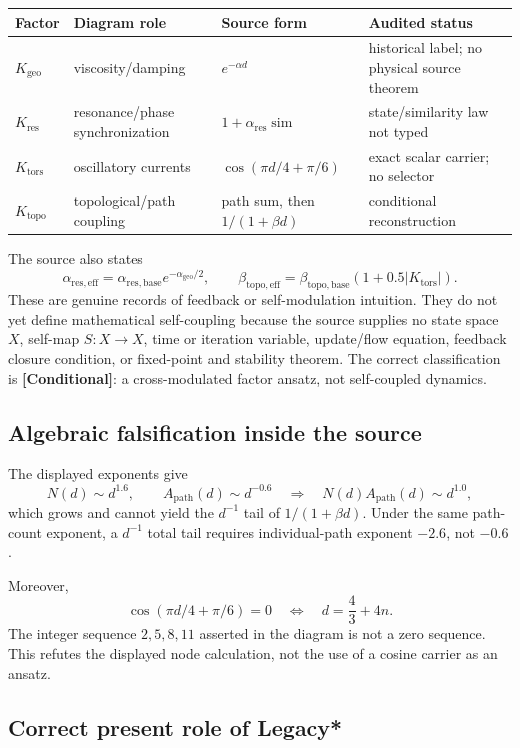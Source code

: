 \documentclass[11pt,a4paper]{article}
\newcommand{\status}[1]{\textbf{[#1]}}
\begin{document}
\begin{longtable}{p{}p{}p{}p{}}
\toprule
Factor & Diagram role & Source form & Audited status\\\midrule
$K_{\mathrm{geo}}$ & viscosity/damping & $e^{-\alpha d}$ & historical label;
no physical source theorem\\
$K_{\mathrm{res}}$ & resonance/phase synchronization &
$1+\alpha_{\mathrm{res}}\operatorname{sim}$ & state/similarity law not typed\\
$K_{\mathrm{tors}}$ & oscillatory currents & $\cos(\pi d/4+\pi/6)$ & exact
scalar carrier; no selector\\
$K_{\mathrm{topo}}$ & topological/path coupling & path sum, then
$1/(1+\beta d)$ & conditional reconstruction\\
\bottomrule
\end{longtable}

The source also states
\[
\alpha_{\mathrm{res,eff}}
=\alpha_{\mathrm{res,base}}e^{-\alpha_{\mathrm{geo}}/2},
\qquad
\beta_{\mathrm{topo,eff}}
=\beta_{\mathrm{topo,base}}(1+0.5|K_{\mathrm{tors}}|).
\]
These are genuine records of feedback or self-modulation intuition. They do
not yet define mathematical self-coupling because the source supplies no state
space $X$, self-map $S:X\to X$, time or iteration variable, update/flow
equation, feedback closure condition, or fixed-point and stability theorem.
The correct classification is \status{Conditional}: a cross-modulated factor
ansatz, not self-coupled dynamics.

\subsection{Algebraic falsification inside the source}

The displayed exponents give
\[
N(d)\sim d^{1.6},\qquad A_{\mathrm{path}}(d)\sim d^{-0.6}
\quad\Longrightarrow\quad
N(d)A_{\mathrm{path}}(d)\sim d^{1.0},
\]
which grows and cannot yield the $d^{-1}$ tail of $1/(1+\beta d)$. Under
the same path-count exponent, a $d^{-1}$ total tail requires individual-path
exponent $-2.6$, not $-0.6$.

Moreover,
\[
\cos(\pi d/4+\pi/6)=0
\quad\Longleftrightarrow\quad d=\frac43+4n.
\]
The integer sequence $2,5,8,11$ asserted in the diagram is not a zero
sequence. This refutes the displayed node calculation, not the use of a cosine
carrier as an ansatz.

\subsection{Correct present role of Legacy*}
\end{document}
